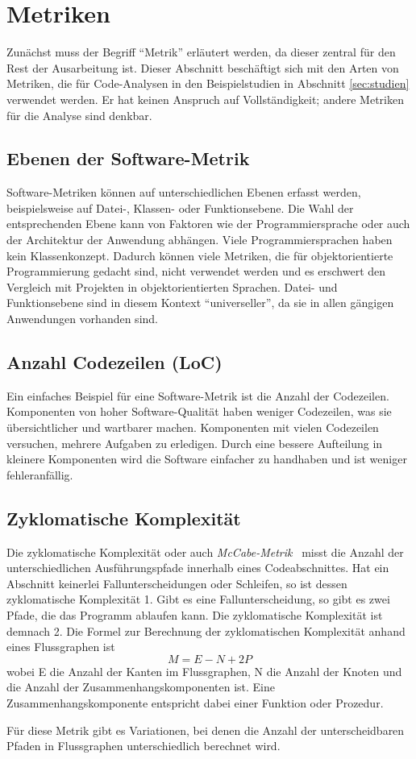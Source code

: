 \section{Metriken}
\label{sec:metriken}
Zunächst muss der Begriff "`Metrik"' erläutert werden, da dieser zentral für den Rest der Ausarbeitung ist.
Dieser Abschnitt beschäftigt sich mit den Arten von Metriken, die für Code-Analysen in den Beispielstudien in Abschnitt \ref{sec:studien} verwendet werden.
Er hat keinen Anspruch auf Vollständigkeit; andere Metriken für die Analyse sind denkbar.

\subsection{Ebenen der Software-Metrik}
Software-Metriken können auf unterschiedlichen Ebenen erfasst werden, beispielsweise auf Datei-, Klassen- oder Funktionsebene.
Die Wahl der entsprechenden Ebene kann von Faktoren wie der Programmiersprache oder auch der Architektur der Anwendung abhängen.
Viele Programmiersprachen haben kein Klassenkonzept.
Dadurch können viele Metriken, die für objektorientierte Programmierung gedacht sind, nicht verwendet werden und es erschwert den Vergleich mit Projekten in objektorientierten Sprachen.
Datei- und Funktionsebene sind in diesem Kontext "`universeller"', da sie in allen gängigen Anwendungen vorhanden sind.

\subsection{Anzahl Codezeilen (LoC)}
Ein einfaches Beispiel für eine Software-Metrik ist die Anzahl der Codezeilen.
Komponenten von hoher Software-Qualität haben weniger Codezeilen, was sie übersichtlicher und wartbarer machen.
Komponenten mit vielen Codezeilen versuchen, mehrere Aufgaben zu erledigen.
Durch eine bessere Aufteilung in kleinere Komponenten wird die Software einfacher zu handhaben und ist weniger fehleranfällig.

\subsection{Zyklomatische Komplexität}
Die zyklomatische Komplexität oder auch \emph{McCabe-Metrik}~\cite{mccabe1976} misst die Anzahl der unterschiedlichen Ausführungspfade innerhalb eines Codeabschnittes.
Hat ein Abschnitt keinerlei Fallunterscheidungen oder Schleifen, so ist dessen zyklomatische Komplexität 1.
Gibt es eine Fallunterscheidung, so gibt es zwei Pfade, die das Programm ablaufen kann.
Die zyklomatische Komplexität ist demnach 2.
Die Formel zur Berechnung der zyklomatischen Komplexität anhand eines Flussgraphen ist
\begin{equation}
	M = E - N + 2P
\end{equation}
wobei E die Anzahl der Kanten im Flussgraphen, N die Anzahl der Knoten und die Anzahl der Zusammenhangskomponenten ist.
Eine Zusammenhangskomponente entspricht dabei einer Funktion oder Prozedur.

Für diese Metrik gibt es Variationen, bei denen die Anzahl der unterscheidbaren Pfaden in Flussgraphen unterschiedlich berechnet wird.
